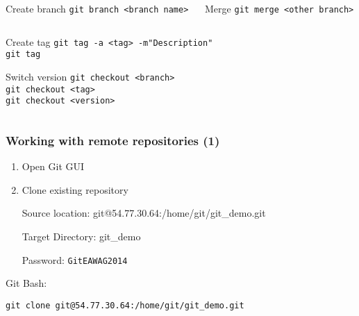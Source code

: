 \documentclass{beamer}
\begin{document}
\begin{frame}[t]
{\begin{columns}[T]
\begin{column}{.66\linewidth}
                \vspace{-2mm}
                \begin{columns}
                    \begin{column}{.45\linewidth}
                        \begin{block}{Create branch}
                                \texttt{git branch <branch name>}
                        \end{block}
                    \end{column}
                    \begin{column}{.45\linewidth}
                        \begin{block}{Merge}
                                \texttt{git merge <other branch>}
                        \end{block}
                    \end{column}
                \end{columns}
                \vspace{-1mm}
                \begin{block}{Create tag}
                        \texttt{git tag -a <tag> -m"Description"}\\
                        \texttt{git tag}
                \end{block}
                \vspace{-1.5mm}
                \begin{block}{Switch version}
                        \texttt{git checkout <branch>}\\
                        \texttt{git checkout <tag>}\\
                        \texttt{git checkout <version>}
                \end{block}
            \end{column}
    \end{columns}}
\end{frame}

\begin{frame}[t]
\frametitle{Working with remote repositories (1)}

\begin{enumerate}
\item Open Git GUI
\item Clone existing repository

Source location: git@54.77.30.64:/home/git/git\_demo.git

Target Directory: git\_demo

Password: \texttt{GitEAWAG2014}
\end{enumerate}

\vfill

Git Bash:
\begin{block}{}
\texttt{git clone git@54.77.30.64:/home/git/git\_demo.git}\\
\end{block}
\end{frame}
\end{document}
